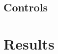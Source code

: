 \documentclass[12pt,conference,onecolumn,titlepage]{IEEEtran} %
\begin{document}
\subsection{Controls}
\label{sec:controls}
\section{Results}
\label{sec:results}


\pagebreak
\printbibliography{}
\end{document}
